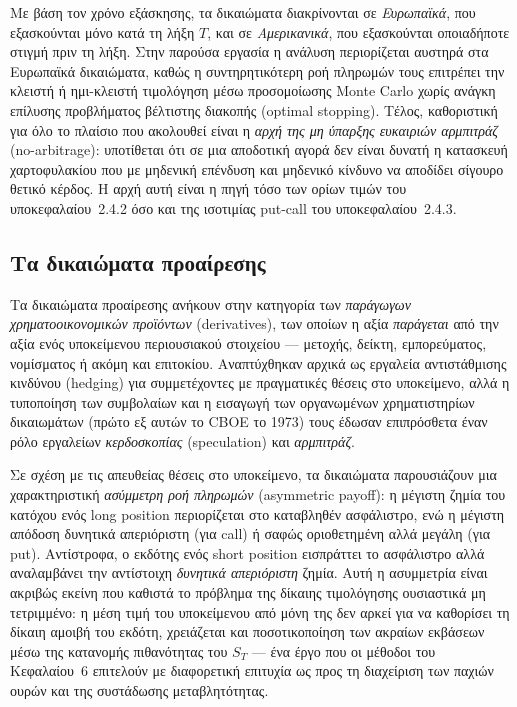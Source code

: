 \documentclass[12pt]{article}
\begin{document}
Με βάση τον χρόνο εξάσκησης, τα δικαιώματα διακρίνονται σε \emph{Ευρωπαϊκά}, που εξασκούνται μόνο κατά τη λήξη $T$, και σε \emph{Αμερικανικά}, που εξασκούνται οποιαδήποτε στιγμή πριν τη λήξη. Στην παρούσα εργασία η ανάλυση περιορίζεται αυστηρά στα Ευρωπαϊκά δικαιώματα, καθώς η συντηρητικότερη ροή πληρωμών τους επιτρέπει την κλειστή ή ημι-κλειστή τιμολόγηση μέσω προσομοίωσης Monte Carlo χωρίς ανάγκη επίλυσης προβλήματος βέλτιστης διακοπής (optimal stopping). Τέλος, καθοριστική για όλο το πλαίσιο που ακολουθεί είναι η \emph{αρχή της μη ύπαρξης ευκαιριών αρμπιτράζ} (no-arbitrage): υποτίθεται ότι σε μια αποδοτική αγορά δεν είναι δυνατή η κατασκευή χαρτοφυλακίου που με μηδενική επένδυση και μηδενικό κίνδυνο να αποδίδει σίγουρο θετικό κέρδος. Η αρχή αυτή είναι η πηγή τόσο των ορίων τιμών του υποκεφαλαίου~2.4.2 όσο και της ισοτιμίας put-call του υποκεφαλαίου~2.4.3.

\subsection{Τα δικαιώματα προαίρεσης}

Τα δικαιώματα προαίρεσης ανήκουν στην κατηγορία των \emph{παράγωγων χρηματοοικονομικών προϊόντων} (derivatives), των οποίων η αξία \emph{παράγεται} από την αξία ενός υποκείμενου περιουσιακού στοιχείου — μετοχής, δείκτη, εμπορεύματος, νομίσματος ή ακόμη και επιτοκίου. Αναπτύχθηκαν αρχικά ως εργαλεία αντιστάθμισης κινδύνου (hedging) για συμμετέχοντες με πραγματικές θέσεις στο υποκείμενο, αλλά η τυποποίηση των συμβολαίων και η εισαγωγή των οργανωμένων χρηματιστηρίων δικαιωμάτων (πρώτο εξ αυτών το CBOE το 1973) τους έδωσαν επιπρόσθετα έναν ρόλο εργαλείων \emph{κερδοσκοπίας} (speculation) και \emph{αρμπιτράζ}.

Σε σχέση με τις απευθείας θέσεις στο υποκείμενο, τα δικαιώματα παρουσιάζουν μια χαρακτηριστική \emph{ασύμμετρη ροή πληρωμών} (asymmetric payoff): η μέγιστη ζημία του κατόχου ενός long position περιορίζεται στο καταβληθέν ασφάλιστρο, ενώ η μέγιστη απόδοση δυνητικά απεριόριστη (για call) ή σαφώς οριοθετημένη αλλά μεγάλη (για put). Αντίστροφα, ο εκδότης ενός short position εισπράττει το ασφάλιστρο αλλά αναλαμβάνει την αντίστοιχη \emph{δυνητικά απεριόριστη} ζημία. Αυτή η ασυμμετρία είναι ακριβώς εκείνη που καθιστά το πρόβλημα της δίκαιης τιμολόγησης ουσιαστικά μη τετριμμένο: η μέση τιμή του υποκείμενου από μόνη της δεν αρκεί για να καθορίσει τη δίκαιη αμοιβή του εκδότη, χρειάζεται και ποσοτικοποίηση των ακραίων εκβάσεων μέσω της κατανομής πιθανότητας του $S_T$ — ένα έργο που οι μέθοδοι του Κεφαλαίου~6 επιτελούν με διαφορετική επιτυχία ως προς τη διαχείριση των παχιών ουρών και της συστάδωσης μεταβλητότητας.
\end{document}
